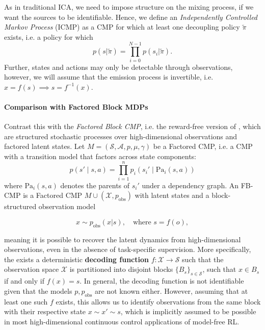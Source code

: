 \documentclass{article}
\theoremstyle{plain}
\theoremstyle{definition}
\theoremstyle{remark}
\newcommand{\sS}{\mathcal{S}}
\newcommand{\sA}{\mathcal{A}}
\begin{document}
As in traditional ICA, we need to impose structure on the mixing process, if we want the sources to be identifiable. Hence, we define an \emph{Independently Controlled Markov Process} (ICMP) as a CMP for which at least one decoupling policy $\tilde\pi$ exists, i.e. a policy for which
\begin{equation}
    p(s|\tilde\pi) = \prod_{i=0}^{N-1} p(s_i|\tilde\pi).
\end{equation}
Further, states and actions may only be detectable through observations, however, we will assume that the emission process is invertible, i.e. $x = f(s) \implies s = f^{-1}(x)$.

\paragraph{Comparison with Factored Block MDPs} Contrast this with the \emph{Factored Block CMP}, i.e. the reward-free version of \citep{misra2021provable}, which are structured stochastic processes over high-dimensional observations and factored latent states. Let $M = (\sS,\sA, p,\mu,\gamma)$ be a Factored CMP, i.e. a CMP with a transition model that factors across state components:
\begin{equation}
    p(s' \mid s, a) = \prod_{i=1}^n p_i(s_i' \mid \mathrm{Pa}_i(s, a))
\end{equation}
where $\mathrm{Pa}_i(s, a)$ denotes the parents of $s_i'$ under a dependency graph. An FB-CMP is a Factored CMP $M\cup(\mathcal{X}, p_\text{obs})$ with latent states and a block-structured observation model

\begin{equation}
    x \sim p_{\text{obs}}(x | s), \quad \text{where } s = f(o),
\end{equation}

meaning it is possible to recover the latent dynamics from high-dimensional observations, even in the absence of task-specific supervision. More specifically, the exists a deterministic \textbf{decoding function} $f: \mathcal{X} \to \mathcal{S}$ such that the observation space $\mathcal{X}$ is partitioned into disjoint blocks $\{B_s\}_{s \in \mathcal{S}}$, such that $x \in B_s$ if and only if $f(x) = s$. In general, the decoding function is not identifiable given that the models $p,p_\text{obs}$ are not known either. However, assuming that at least one such $f$ exists, this allows us to identify observations from the same block with their respective state $x\sim x'\sim s$, which is implicitly assumed to be possible in most high-dimensional continuous control applications of model-free RL.
\end{document}
